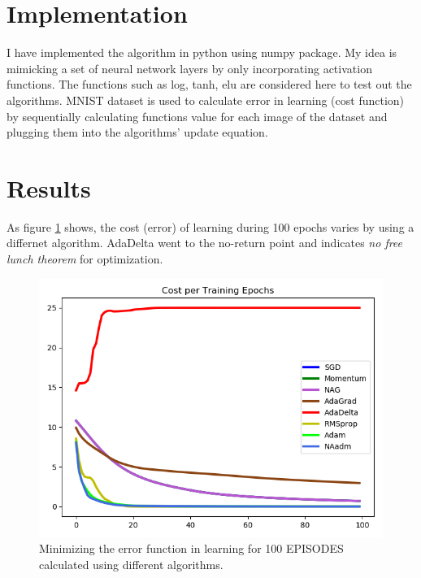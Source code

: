 \documentclass[12pt]{article}
\begin{document}
\section{Implementation}
I have implemented the algorithm in python using numpy package. My idea is mimicking a set of neural network layers by only incorporating activation functions. The functions such as log, tanh, elu are considered here to test out the algorithms. MNIST dataset is used to calculate error in learning (cost function) by sequentially calculating functions value for each image of the dataset and plugging them into the algorithms' update equation.

\section{Results}
As figure \ref{fig:algorithms_cost_function} shows, the cost (error) of learning during 100 epochs varies by using a differnet algorithm. AdaDelta went to the no-return point and indicates \textit{no free lunch theorem} for optimization.
\begin{figure}
    \centering
    \includegraphics[width=1\columnwidth]{presentation/MathOpt-proj/myplot.png}
    \caption{Minimizing the error function in learning for 100 EPISODES calculated using different algorithms.}
    \label{fig:algorithms_cost_function}
\end{figure}




\end{document}
